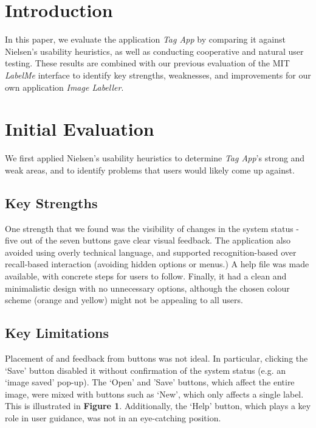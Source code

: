 \documentclass[11pt,twocolumn]{article}
\title{\thetitle}
\author{\theauthor}
\date{\today}
\begin{document}
\maketitle
\thispagestyle{empty}

\section{Introduction}

In this paper, we evaluate the application \emph{Tag App} by comparing it against Nielsen's usability heuristics, as well as conducting cooperative and natural user testing. These results are combined with our previous evaluation of the MIT \emph{LabelMe} interface to identify key strengths, weaknesses, and improvements for our own application \emph{Image Labeller}.

\section{Initial Evaluation}

We first applied Nielsen's usability heuristics\cite{nielsen1994} to determine \emph{Tag App}'s strong and weak areas, and to identify problems that users would likely come up against.

\subsection{Key Strengths}

One strength that we found was the visibility of changes in the system status - five out of the seven buttons gave clear visual feedback. The application also avoided using overly technical language, and supported recognition-based over recall-based interaction (avoiding hidden options or menus.) A help file was made available, with concrete steps for users to follow. Finally, it had a
clean and minimalistic design with no unnecessary options, although the chosen colour scheme (orange and yellow) might not be appealing to all users. 

\subsection{Key Limitations}

\indent \indent Placement of and feedback from buttons was not ideal. In particular, clicking the `Save' button disabled it without confirmation of the system status (e.g. an `image saved' pop-up). The `Open' and 'Save' buttons, which affect the entire image, were mixed with buttons such as `New', which only affects a single label. This is illustrated in {\bf Figure 1}. Additionally, the `Help' button, which plays a key role in user guidance, was not in an eye-catching position.
\end{document}
